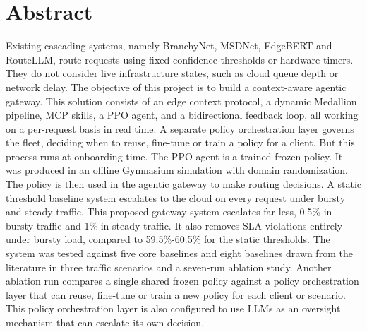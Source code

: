 \hypertarget{abstract}{%
\section{Abstract}\label{abstract}}

Existing cascading systems, namely BranchyNet, MSDNet, EdgeBERT and
RouteLLM, route requests using fixed confidence thresholds or hardware
timers. They do not consider live infrastructure states, such as cloud
queue depth or network delay. The objective of this project is to build
a context-aware agentic gateway. This solution consists of an edge
context protocol, a dynamic Medallion pipeline, MCP skills, a PPO
agent, and a bidirectional feedback loop, all working on a per-request
basis in real time. A separate policy orchestration layer governs the
fleet, deciding when to reuse, fine-tune or train a policy for a
client. But this process runs at onboarding time.
The PPO agent is a trained frozen policy. It was produced in an offline
Gymnasium simulation with domain randomization. The policy is then used
in the agentic gateway to make routing decisions. A static threshold
baseline system escalates to the cloud on every request under bursty and
steady traffic. This proposed gateway system escalates far less, 0.5\%
in bursty traffic and 1\% in steady traffic. It also removes SLA
violations entirely under bursty load, compared to 59.5\%-60.5\% for the
static thresholds. The system was tested against five core baselines and
eight baselines drawn from the literature in three traffic scenarios and
a seven-run ablation study. Another ablation run compares a single
shared frozen policy against a policy orchestration layer that can
reuse, fine-tune or train a new policy for each client or scenario. This
policy orchestration layer is also configured to use LLMs as an
oversight mechanism that can escalate its own decision.
